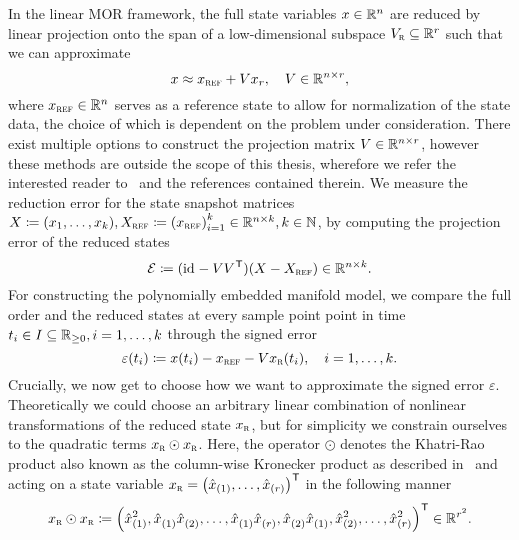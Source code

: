 In the linear MOR framework, the full state variables $x \in \mathbb{R}^n$ are reduced by linear projection onto the span of a low-dimensional subspace $V_{\textnormal{\scshape r}} \subseteq \mathbb{R}^r$ such that we can approximate
\begin{equation}\label{eq:linear-state-reduction}
    x \approx x_{\textnormal{\scshape ref}} + V x_r,\quad V \in \mathbb{R}^{n \times r},
\end{equation}
where $x_{\textnormal{\scshape ref}} \in \mathbb{R}^n$ serves as a reference state to allow for normalization of the state data, the choice of which is dependent on the problem under consideration.
There exist multiple options to construct the projection matrix $V \in \mathbb{R}^{n \times r}$, however these methods are outside the scope of this thesis, wherefore we refer the interested reader to~\cite{BOP2017, BCO2017} and the references contained therein.
We measure the reduction error for the state snapshot matrices $X \coloneqq (x_1, \dots, x_k), X_{\textnormal{\scshape ref}} \coloneqq {(x_{\textnormal{\scshape ref}})}_{i = 1}^k \in \mathbb{R}^{n \times k},k \in \mathbb{N}$, by computing the projection error of the reduced states
\begin{equation}
    \mathcal{E} \coloneqq (\text{id}_{} - V V^{\mkern1mu \mathsf{T}}) (X - X_{\textnormal{\scshape ref}}) \in \mathbb{R}^{n \times k}.
\end{equation}
For constructing the polynomially embedded manifold model, we compare the full order and the reduced states at every sample point point in time $t_i \in I \subseteq \mathbb{R}_{\geq 0}, i = 1, \dots, k$ through the signed error
\begin{equation}\label{eq:linear-signed-error}
    \varepsilon(t_i) \coloneqq x(t_i) - x_{\textnormal{\scshape ref}} - V x_{\textnormal{\scshape r}}(t_i),\quad i = 1, \dots, k.
\end{equation}
Crucially, we now get to choose how we want to approximate the signed error $\varepsilon$.
Theoretically we could choose an arbitrary linear combination of nonlinear transformations of the reduced state $x_{\textnormal{\scshape r}}$, but for simplicity we constrain ourselves to the quadratic terms $x_{\textnormal{\scshape r}} \odot x_{\textnormal{\scshape r}}$.
Here, the operator $\odot$ denotes the Khatri-Rao product also known as the column-wise Kronecker product as described in~\cite{Slyusar1999, Shuangzhe2008, Favier2021} and acting on a state variable $x_{\textnormal{\scshape r}} = {\left( \hat{x}_{(1)}, \dots, \hat{x}_{(r)} \right)}^{\mkern1mu \mathsf{T}}$ in the following manner
\begin{equation}\label{eq:redundant-khatri-rao}
    x_{\textnormal{\scshape r}} \odot x_{\textnormal{\scshape r}} \coloneqq {\left( \hat{x}_{(1)}^2, \hat{x}_{(1)}^{\phantom{1}} \hat{x}_{(2)}^{\phantom{1}}, \dots, \hat{x}_{(1)}^{\phantom{1}} \hat{x}_{(r)}^{\phantom{1}}, \hat{x}_{(2)}^{\phantom{1}} \hat{x}_{(1)}^{\phantom{1}}, \hat{x}_{(2)}^2, \dots, \hat{x}_{(r)}^2 \right)}^{\mkern1mu \mathsf{T}} \in \mathbb{R}^{r^2}.
\end{equation}
